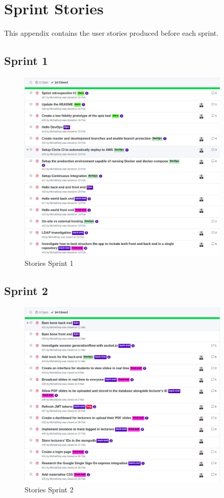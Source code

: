 \chapter{Sprint Stories}
\label{chap:spintstories}

This appendix contains the user stories produced before each sprint.

\section{Sprint 1}
\begin{figure}[ht]
    \centering
    \includegraphics[width=0.9\textwidth]{Appendix3/1.jpg}
    \caption{Stories Sprint 1}
    \label{fig:sprintstories1}
\end{figure}

\newpage
\section{Sprint 2}
\begin{figure}[ht]
    \centering
    \includegraphics[width=0.9\textwidth]{Appendix3/2.jpg}
    \caption{Stories Sprint 2}
    \label{fig:sprintstories2}
\end{figure}

